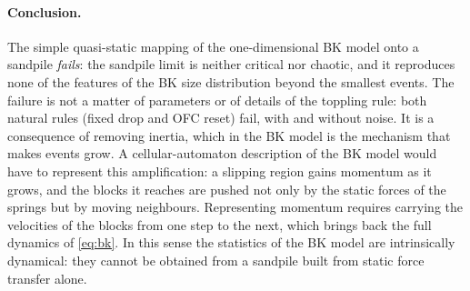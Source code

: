 \paragraph{Conclusion.} The simple quasi-static mapping of the one-dimensional BK model onto a sandpile \emph{fails}: the sandpile limit is neither critical
nor chaotic, and it reproduces none of the features of the BK size distribution beyond the smallest events. The failure is not a matter of parameters or of
details of the toppling rule: both natural rules (fixed drop and OFC reset) fail, with and without noise. It is a consequence of removing inertia, which in
the BK model is the mechanism that makes events grow. A cellular-automaton description of the BK model would have to represent this amplification:
a slipping region gains momentum as it grows, and the blocks it reaches are pushed not only by the static forces of the springs but by moving
neighbours. Representing momentum requires carrying the velocities of the blocks from one step to the next, which brings back the full dynamics of
\cref{eq:bk}. In this sense the statistics of the BK model are intrinsically dynamical: they cannot be obtained from a sandpile built from static
force transfer alone.
